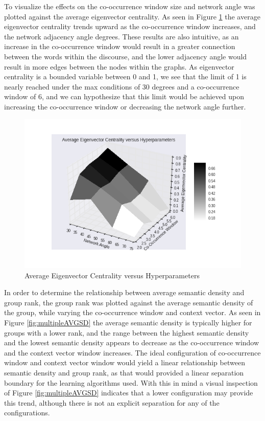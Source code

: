 \documentclass[11pt]{article}
\begin{document}
To visualize the effects on the co-occurrence window size and network angle was plotted against the average eigenvector centrality. As seen in Figure \ref{fig:EVC_surface} the average eigenvector centrality trends upward as the co-occurrence window increases, and the network adjacency angle degrees. These results are also intuitive, as an increase in the co-occurrence window would result in a greater connection between the words within the discourse, and the lower adjacency angle would result in more edges between the nodes within the graphs. As eigenvector centrality is a bounded variable between 0 and 1, we see that the limit of 1 is nearly reached under the max conditions of 30 degrees and a co-occurrence window of 6, and we can hypothesize that this limit would be achieved upon increasing the co-occurrence window or decreasing the network angle further.

\begin{figure}[h]
\begin{center}
\includegraphics[width = \textwidth]{figs/EVC_surface}
\caption{Average Eigenvector Centrality versus Hyperparameters}
\label{fig:EVC_surface}
\end{center}
\end{figure}

In order to determine the relationship between average semantic density and group rank, the group rank was plotted against the average semantic density of the group, while varying the co-occurrence window and context vector. As seen in Figure \ref{fig:multipleAVGSD} the average semantic density is typically higher for groups with a lower rank, and the range between the highest semantic density and the lowest semantic density appears to decrease as the co-occurrence window and the context vector window increases. The ideal configuration of co-occurrence window and context vector window would yield a linear relationship between semantic density and group rank, as that would provided a linear separation boundary for the learning algorithms used. With this in mind a visual inspection of Figure \ref{fig:multipleAVGSD} indicates that a lower configuration may provide this trend, although there is not an explicit separation for any of the configurations.
\end{document}
